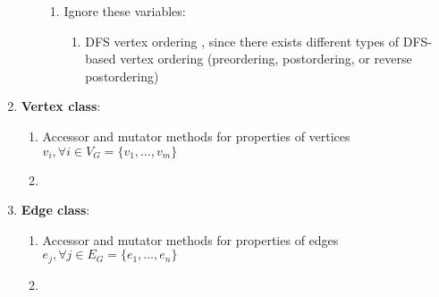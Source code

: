 \begin{enumerate}
\begin{enumerate}
\begin{enumerate}
		\item Ignore these variables: \vspace{-0.1cm}
			\begin{enumerate} \itemsep -1pt
			\item DFS vertex ordering \cite[\S53, pp. 857]{Goldman2008}, since there exists different types of DFS-based vertex ordering (preordering, postordering, or reverse postordering) \cite{WikipediaContributors2018a51}
			\end{enumerate}
		\end{enumerate}
	\end{enumerate}
\item {\bf Vertex class}: \vspace{-0.3cm}
	\begin{enumerate} \itemsep -2pt
	\item Accessor and mutator methods for properties of vertices $v_{i}, \forall i \in V_{G} = \{v_{1}, \dots, v_{m}\}$
	\item 
	\end{enumerate}
\item {\bf Edge class}: \vspace{-0.3cm}
	\begin{enumerate} \itemsep -2pt
	\item Accessor and mutator methods for properties of edges $e_{j}, \forall j \in E_{G} = \{e_{1}, \dots, e_{n}\}$
	\item 
	\end{enumerate}
\end{enumerate}


